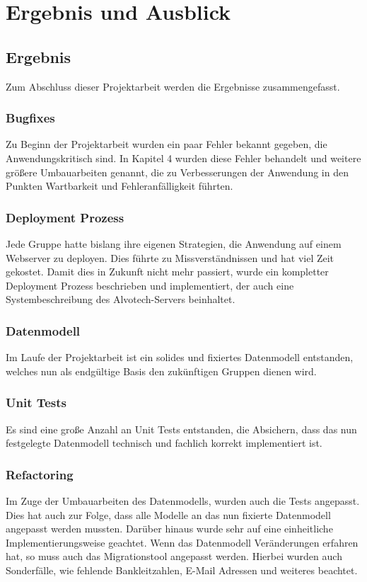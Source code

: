 \documentclass[12pt,             %
               a4paper,          %
               listof=totoc,     %
               index=totoc,      %
               bibliography=totoc,%
               oneside,         %
               BCOR1cm,          %
               english   %
               ]{scrbook}
\begin{document}
\chapter{Ergebnis und Ausblick}
\section{Ergebnis}
Zum Abschluss dieser Projektarbeit werden die Ergebnisse zusammengefasst. 

\subsection{Bugfixes}
Zu Beginn der Projektarbeit wurden ein paar Fehler bekannt gegeben, die Anwendungskritisch sind. In Kapitel 4 wurden diese Fehler behandelt und weitere größere Umbauarbeiten genannt, die zu Verbesserungen der Anwendung in den Punkten Wartbarkeit und Fehleranfälligkeit führten.

\subsection{Deployment Prozess}
Jede Gruppe hatte bislang ihre eigenen Strategien, die Anwendung auf einem Webserver zu deployen. Dies führte zu Missverständnissen und hat viel Zeit gekostet. Damit dies in Zukunft nicht mehr passiert, wurde ein kompletter Deployment Prozess beschrieben und implementiert, der auch eine Systembeschreibung des Alvotech-Servers beinhaltet.

\subsection{Datenmodell}
Im Laufe der Projektarbeit ist ein solides und fixiertes Datenmodell entstanden, welches nun als endgültige Basis den zukünftigen Gruppen dienen wird.

\subsection{Unit Tests}
Es sind eine große Anzahl an Unit Tests entstanden, die Absichern, dass das nun festgelegte Datenmodell technisch und fachlich korrekt implementiert ist. 

\subsection{Refactoring}
Im Zuge der Umbauarbeiten des Datenmodells, wurden auch die Tests angepasst. Dies hat auch zur Folge, dass alle Modelle an das nun fixierte Datenmodell angepasst werden mussten. Darüber hinaus wurde sehr auf eine einheitliche Implementierungsweise geachtet. Wenn das Datenmodell Veränderungen erfahren hat, so muss auch das Migrationstool angepasst werden. Hierbei wurden auch Sonderfälle, wie fehlende Bankleitzahlen, E-Mail Adressen und weiteres beachtet.
\end{document}
